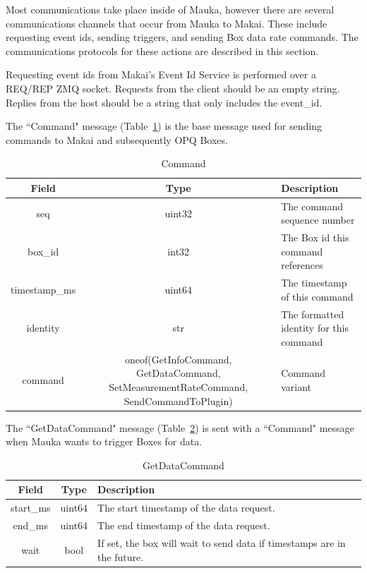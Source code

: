 Most communications take place inside of Mauka, however there are several communications channels that occur from Mauka to Makai. These include requesting event ids, sending triggers, and sending Box data rate commands. The communications protocols for these actions are described in this section.

Requesting event ids from Makai's Event Id Service is performed over a REQ/REP ZMQ socket. Requests from the client should be an empty string. Replies from the host should be a string that only includes the event\_id.

The ``Command" message (Table~\ref{table:Command}) is the base message used for sending commands to Makai and subsequently OPQ Boxes.

\begin{table}[H]
	\centering
	\caption{Command}
	\begin{tabular}{|c|c|p{8cm}|}
		\hline
		Field & Type & Description  \\
		\hline
		seq & uint32 & The command sequence number \\
		\hline
		box\_id & int32 & The Box id this command references \\
		\hline
		timestamp\_ms & uint64 & The timestamp of this command \\
		\hline
		identity & str & The formatted identity for this command \\
		\hline
		command & oneof(GetInfoCommand, GetDataCommand, SetMeasurementRateCommand, SendCommandToPlugin) & Command variant \\
		\hline
	\end{tabular}
	\label{table:Command}
\end{table}

The ``GetDataCommand" message (Table~\ref{table:GetDataCommand}) is sent with a ``Command" message when Mauka wants to trigger Boxes for data.

\begin{table}[H]
	\centering
	\caption{GetDataCommand}
	\begin{tabular}{|c|c|p{8cm}|}
		\hline
		Field & Type & Description  \\
		\hline
		start\_ms & uint64 & The start timestamp of the data request. \\
		\hline
		end\_ms & uint64 & The end timestamp of the data request. \\
		\hline
		wait & bool & If set, the box will wait to send data if timestamps are in the future. \\
		\hline
	\end{tabular}
	\label{table:GetDataCommand}
\end{table}

